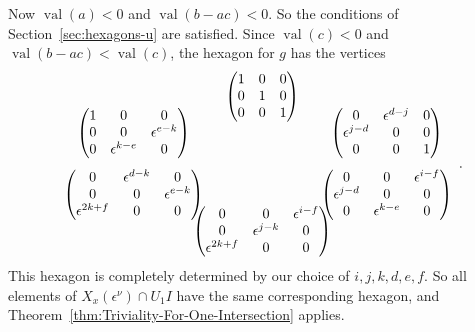 \documentclass{amsart}
\theoremstyle{definition}
\def\e{\epsilon}
\def\val{\mathop{\mathrm{val}}}
\def\en{\e^{\nu}}
\def\X{X_x(\en)}
\def\heximages#1#2#3#4#5#6{
  \heximagessqueezedcarefully{1.7em}{-1em}{#1}{#2}{#3}{#4}{#5}{#6}
}
\def\heximagessqueezedcarefully#1#2#3#4#5#6#7#8{
  \begin{array}{ccc}
    & #3 & \\[#2]
    #5 \hspace{-#1} & & \hspace{-#1} #4 \\[2em]
    #6 \hspace{-#1} & & \hspace{-#1} #7 \\[#2]
    & #8 &
  \end{array}
}
\begin{document}
  Now $\val(a) < 0$ and $\val(b-ac) < 0$.  So the conditions of
  Section~\ref{sec:hexagons-u} are satisfied.  Since $\val(c) < 0$ and
  $\val(b-ac) < \val(c)$, the hexagon for $g$ has the vertices
  \begin{equation*}
    \heximages
	{\begin{pmatrix}
	    1 & 0 & 0 \\
	    0 & 1 & 0 \\
	    0 & 0 & 1
	\end{pmatrix}}
	{\begin{pmatrix}
	    0 & \e^{d-j} & 0 \\
	    \e^{j-d} & 0 & 0 \\
	    0 & 0 & 1
	\end{pmatrix}}
	{\begin{pmatrix}
	    1 & 0 & 0 \\
	    0 & 0 & \e^{e-k} \\
	    0 & \e^{k-e} & 0
	\end{pmatrix}}
	{\begin{pmatrix}
	    0 & \e^{d-k} & 0 \\
	    0 & 0 & \e^{e-k} \\
	    \e^{2k+f} & 0 & 0
	\end{pmatrix}}
	{\begin{pmatrix}
	    0 & 0 & \e^{i-f} \\
	    \e^{j-d} & 0 & 0 \\
	    0 & \e^{k-e} & 0
	\end{pmatrix}}
	{\begin{pmatrix}
	    0 & 0 & \e^{i-f} \\
	    0 & \e^{j-k} & 0 \\
	    \e^{2k+f} & 0 & 0
	\end{pmatrix}}.
  \end{equation*}
  This hexagon is completely determined by our choice of $i,j,k,d,e,f$.  So all
  elements of $\X \cap U_1 I$ have the same corresponding hexagon, and
  Theorem~\ref{thm:Triviality-For-One-Intersection} applies.
\end{document}

